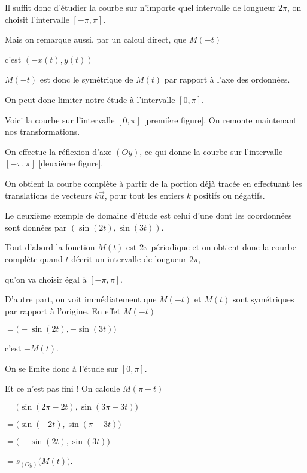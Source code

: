 \change
Il suffit donc d'étudier la courbe sur n'importe quel intervalle de longueur $2\pi$, 
on choisit l'intervalle $[-\pi,\pi]$.


\change
Mais on remarque aussi, par un calcul direct, que $M(-t)$ 

\change
c'est $(-x(t),y(t))$

\change
$M(-t)$ est donc le symétrique de $M(t)$  par rapport à l'axe des ordonnées. 

\change
On peut donc limiter notre étude à l'intervalle $[0,\pi]$.

\change
Voici la courbe sur l'intervalle $[0,\pi]$ [première figure].
On remonte maintenant nos transformations.

\change
On effectue la réflexion d'axe $(Oy)$, ce qui donne la courbe
sur l'intervalle $[-\pi,\pi]$ [deuxième figure].

\change
On obtient la courbe complète à partir de la portion déjà tracée
en effectuant les translations de vecteurs $k\vec{u}$, 
pour tout les entiers $k$ positifs ou négatifs.



\diapo

Le deuxième exemple de domaine d'étude est celui d'une  
dont les coordonnées sont données par $(\sin(2t),\sin(3t))$.

\change

Tout d'abord la fonction $M(t)$ est $2\pi$-périodique et on obtient donc la courbe 
complète quand $t$ décrit un intervalle de longueur $2\pi$, 

\change
qu'on va choisir égal à $[-\pi,\pi]$.

\change
D'autre part, on voit immédiatement que $M(-t)$ et $M(t)$ 
sont symétriques par rapport à l'origine.
En effet $M(-t)$

\change
$= \big(-\sin(2t),-\sin(3t)\big)$ 

\change
c'est $-M(t)$.

\change
On se limite donc à l'étude sur $[0,\pi]$.

\change
Et ce n'est pas fini !
On calcule $M(\pi-t)$ 

\change
$=\big(\sin(2\pi-2t),\sin(3\pi-3t)\big)$

\change
$=\big(\sin(-2t),\sin(\pi-3t)\big)$

\change
$=\big(-\sin(2t),\sin(3t)\big)$

\change
$=s_{(Oy)}\big(M(t)\big)$.

